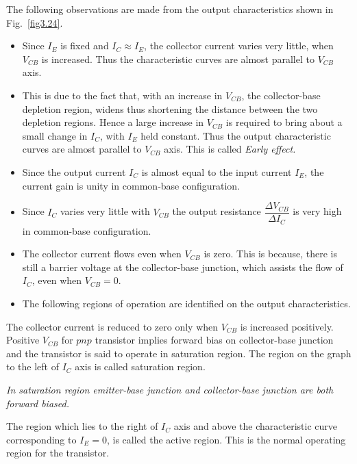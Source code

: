 The following observations are made from the output characteristics shown in Fig.~\ref{fig3.24}.
\begin{itemize}
\item Since $I_{E}$ is fixed and $I_{C}\approx I_{E}$, the collector current varies very little, when $V_{CB}$ is increased. Thus the characteristic curves are almost parallel to $V_{CB}$ axis.

\item This is due to the fact that, with an increase in $V_{CB}$, the collector-base depletion region, widens thus  shortening the distance between the two depletion regions. Hence a large increase in $V_{CB}$ is required to bring about a small change in $I_{C}$, with $I_{E}$ held constant. Thus the output characteristic curves are almost parallel to $V_{CB}$ axis. This is called {\em Early effect.}

\item Since the output current $I_{C}$ is almost equal to the input current $I_{E}$, the current gain is unity in common-base configuration.

\item Since $I_{C}$ varies very little with $V_{CB}$ the output resistance $\dfrac{\Delta V_{CB}}{\Delta I_{C}}$ is very high in common-base configuration.

\item The collector current flows even when $V_{CB}$ is zero. This is because, there is still a barrier voltage at the collector-base junction, which assists the flow of $I_{C}$, even when $V_{CB}=0$.

\item The following regions of operation are identified on the output characteristics. 
\end{itemize}

\smallskip
{}

The collector current is reduced to zero only when $V_{CB}$ is increased positively. Positive $V_{CB}$ for $pnp$ transistor implies forward bias on collector-base junction and the transistor is said to operate in saturation region. The region on the graph to the left of $I_{C}$ axis is called saturation region. 

{\em In saturation region emitter-base junction and collector-base junction are both forward biased.}

\smallskip
{}


The region which lies to the right of $I_{C}$ axis and above the characteristic curve corresponding to $I_{E}=0$, is called the active region. This is the normal operating region for the transistor.

